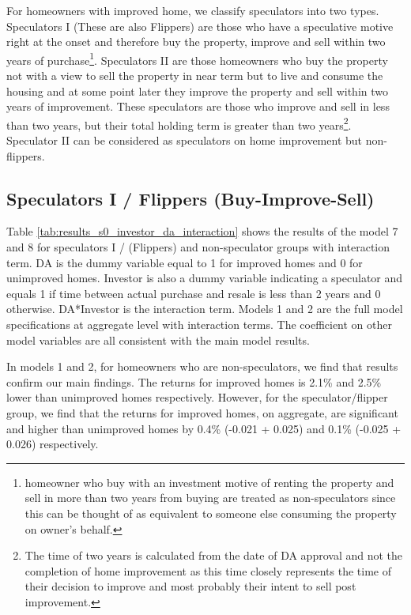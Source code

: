 \documentclass[AEJ,reqno, draftmode]{AEA} %
\begin{document}
For homeowners with improved home, we classify speculators into two types. Speculators I (These are also Flippers) are those who have a speculative motive right at the onset and therefore buy the property, improve and sell within two years of purchase\footnote{homeowner who buy with an investment motive of renting the property and sell in more than two years from buying are treated as non-speculators since this can be thought of as equivalent to someone else consuming the property on owner's behalf.}. Speculators II are those homeowners who buy the property not with a view to sell the property in near term but to live and consume the housing and at some point later they improve the property and sell within two years of improvement. These speculators are those who improve and sell in less than two years, but their total holding term is greater than two years\footnote{The time of two years is calculated from the date of DA approval and not the completion of home improvement as this time closely represents the time of their decision to improve and most probably their intent to sell post improvement.}. Speculator II can be considered as speculators on home improvement but non-flippers.


\subsection{Speculators I / Flippers (Buy-Improve-Sell)}

Table \ref{tab:results_s0_investor_da_interaction} shows the results of the model 7 and 8 for speculators I / (Flippers) and non-speculator groups with interaction term. DA is the dummy variable equal to 1 for improved homes and 0 for unimproved homes. Investor is also a dummy variable indicating a speculator and equals 1 if time between actual purchase and resale is less than 2 years and 0 otherwise. DA*Investor is the interaction term. Models 1 and 2 are the full model specifications at aggregate level with interaction terms. The coefficient on other model variables are all consistent with the main model results.


In models 1 and 2, for homeowners who are non-speculators, we find that results confirm our main findings. The returns for improved homes is 2.1\% and 2.5\% lower than unimproved homes respectively. However, for the speculator/flipper group, we find that the returns for improved homes, on aggregate, are significant and higher than unimproved homes by 0.4\% (-0.021 + 0.025) and 0.1\% (-0.025 + 0.026) respectively.
\end{document}
